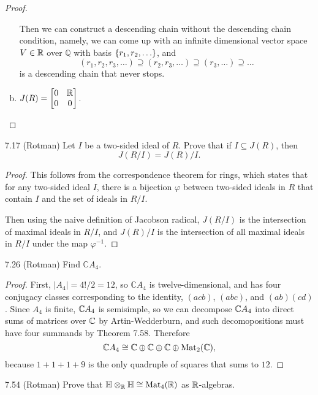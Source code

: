 \documentclass{article}
\begin{document}
\begin{proof}
\begin{enumerate}[(a)]
\[    \]
    Then we can construct a descending chain without the descending chain
    condition, namely, we can come up with an infinite dimensional vector space
    $V \in \mathbb R$ over $\mathbb Q$ with basis $\left\{ r_1, r_2, \hdots \right\}$, and
    \[
      (r_1, r_2, r_3, \hdots)
      \supseteq (r_2, r_3, \hdots)
      \supseteq (r_3, \hdots)
      \supseteq \hdots
    \] is a descending chain that never stops.
    \item $J(R) = \begin{bmatrix} 0 & \mathbb R \\ 0 & 0 \end{bmatrix}$.
  \end{enumerate}
\end{proof}
\pagebreak
\begin{problem}{7.17 (Rotman)} %
  Let $I$ be a two-sided ideal of $R$. Prove that if $I \subseteq J(R)$, then \[
    J(R/I) = J(R)/I.
  \]
\end{problem}

\begin{proof} This follows from the correspondence theorem for rings, which
  states that for any two-sided ideal $I$, there is a bijection $\varphi$ between
  two-sided ideals in $R$ that contain $I$ and the set of ideals in $R/I$.

  Then using the naive definition of Jacobson radical, $J(R/I)$ is the
  intersection of maximal ideals in $R/I$, and $J(R)/I$ is the intersection of
  all maximal ideals in $R/I$ under the map $\varphi^{-1}$.
\end{proof}
\begin{problem}{7.26 (Rotman)} %
  Find $\mathbb CA_4$.
\end{problem}

\begin{proof}
  First, $|A_4| = 4!/2 = 12$, so $\mathbb CA_4$ is twelve-dimensional, and has
  four conjugacy classes corresponding to the identity, $(acb)$, $(abc)$, and $(ab)(cd)$.
  Since $A_4$ is finite, $\mathbb C A_4$ is semisimple, so we can decompose $\mathbb C A_4$
  into direct sums of matrices over $\mathbb C$  by Artin-Wedderburn, and such
  decomopositions must have four summands by Theorem 7.58. Therefore \[
    \mathbb CA_4 \cong
    \mathbb C \oplus \mathbb C \oplus \mathbb C \oplus
    \operatorname{Mat}_2(\mathbb C),
  \] because $1 + 1 + 1 + 9$ is the only quadruple of squares that sums to $12$.
\end{proof}
\pagebreak
\begin{problem}{7.54 (Rotman)} %
  Prove that $\mathbb H \otimes_\mathbb{R} \mathbb H \cong \operatorname{Mat}_4(\mathbb R)$ as $\mathbb R$-algebras.
\end{problem}
\end{document}
